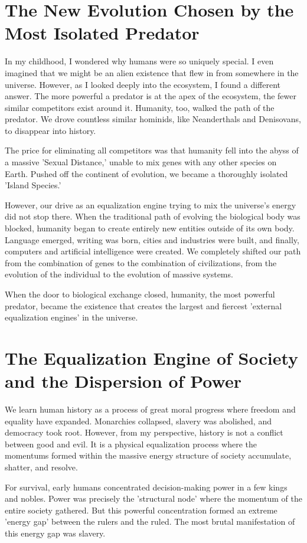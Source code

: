 \documentclass[11pt,a4paper]{article}
\begin{document}
\section*{The New Evolution Chosen by the Most Isolated Predator}
In my childhood, I wondered why humans were so uniquely special. I even imagined that we might be an alien existence that flew in from somewhere in the universe. However, as I looked deeply into the ecosystem, I found a different answer. The more powerful a predator is at the apex of the ecosystem, the fewer similar competitors exist around it. Humanity, too, walked the path of the predator. We drove countless similar hominids, like Neanderthals and Denisovans, to disappear into history.

The price for eliminating all competitors was that humanity fell into the abyss of a massive 'Sexual Distance,' unable to mix genes with any other species on Earth. Pushed off the continent of evolution, we became a thoroughly isolated 'Island Species.'

However, our drive as an equalization engine trying to mix the universe's energy did not stop there. When the traditional path of evolving the biological body was blocked, humanity began to create entirely new entities outside of its own body. Language emerged, writing was born, cities and industries were built, and finally, computers and artificial intelligence were created. We completely shifted our path from the combination of genes to the combination of civilizations, from the evolution of the individual to the evolution of massive systems.

When the door to biological exchange closed, humanity, the most powerful predator, became the existence that creates the largest and fiercest 'external equalization engines' in the universe.

\section*{The Equalization Engine of Society and the Dispersion of Power}
We learn human history as a process of great moral progress where freedom and equality have expanded. Monarchies collapsed, slavery was abolished, and democracy took root. However, from my perspective, history is not a conflict between good and evil. It is a physical equalization process where the momentums formed within the massive energy structure of society accumulate, shatter, and resolve.

For survival, early humans concentrated decision-making power in a few kings and nobles. Power was precisely the 'structural node' where the momentum of the entire society gathered. But this powerful concentration formed an extreme 'energy gap' between the rulers and the ruled. The most brutal manifestation of this energy gap was slavery.
\end{document}
